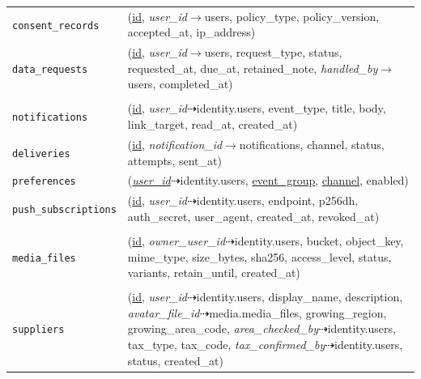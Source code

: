 \begin{longtable}{L{3.10cm} L{11.90cm}}
\texttt{consent\_\allowbreak{}records} & (\underline{id}, \textit{user\_\allowbreak{}id}$\rightarrow$users, policy\_\allowbreak{}type, policy\_\allowbreak{}version, accepted\_\allowbreak{}at, ip\_\allowbreak{}address) \\
\texttt{data\_\allowbreak{}requests} & (\underline{id}, \textit{user\_\allowbreak{}id}$\rightarrow$users, request\_\allowbreak{}type, status, requested\_\allowbreak{}at, due\_\allowbreak{}at, retained\_\allowbreak{}note, \textit{handled\_\allowbreak{}by}$\rightarrow$users, completed\_\allowbreak{}at) \\
 \\
\texttt{notifications} & (\underline{id}, \textit{user\_\allowbreak{}id}$\dashrightarrow$identity.users, event\_\allowbreak{}type, title, body, link\_\allowbreak{}target, read\_\allowbreak{}at, created\_\allowbreak{}at) \\
\texttt{deliveries} & (\underline{id}, \textit{notification\_\allowbreak{}id}$\rightarrow$notifications, channel, status, attempts, sent\_\allowbreak{}at) \\
\texttt{preferences} & (\textit{\underline{user\_\allowbreak{}id}}$\dashrightarrow$identity.users, \underline{event\_\allowbreak{}group}, \underline{channel}, enabled) \\
\texttt{push\_\allowbreak{}subscriptions} & (\underline{id}, \textit{user\_\allowbreak{}id}$\dashrightarrow$identity.users, endpoint, p256dh, auth\_\allowbreak{}secret, user\_\allowbreak{}agent, created\_\allowbreak{}at, revoked\_\allowbreak{}at) \\
 \\
\texttt{media\_\allowbreak{}files} & (\underline{id}, \textit{owner\_\allowbreak{}user\_\allowbreak{}id}$\dashrightarrow$identity.users, bucket, object\_\allowbreak{}key, mime\_\allowbreak{}type, size\_\allowbreak{}bytes, sha256, access\_\allowbreak{}level, status, variants, retain\_\allowbreak{}until, created\_\allowbreak{}at) \\
 \\
\texttt{suppliers} & (\underline{id}, \textit{user\_\allowbreak{}id}$\dashrightarrow$identity.users, display\_\allowbreak{}name, description, \textit{avatar\_\allowbreak{}file\_\allowbreak{}id}$\dashrightarrow$media.media\_\allowbreak{}files, growing\_\allowbreak{}region, growing\_\allowbreak{}area\_\allowbreak{}code, \textit{area\_\allowbreak{}checked\_\allowbreak{}by}$\dashrightarrow$identity.users, tax\_\allowbreak{}type, tax\_\allowbreak{}code, \textit{tax\_\allowbreak{}confirmed\_\allowbreak{}by}$\dashrightarrow$identity.users, status, created\_\allowbreak{}at) \\

\end{longtable}

